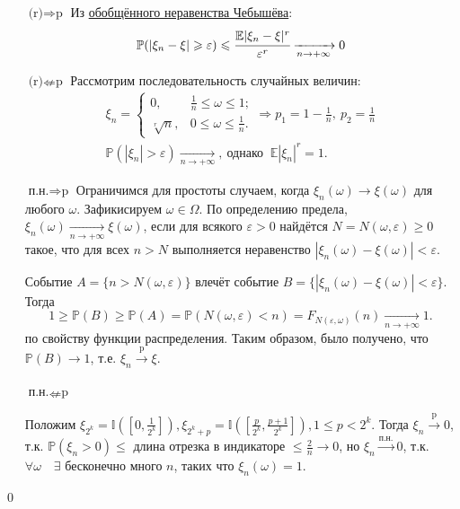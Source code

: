 \documentclass[oneside,final,14pt]{extreport}
\renewenvironment{proof}{{\bfseries Доказательство.}}{\qed}
\theoremstyle{plain}
\theoremstyle{definition}
\theoremstyle{named}
\begin{document}
\begin{proof}
    \begin{itemize}
        \item[$\text{(r)} \Rightarrow \text{p}$] Из \hyperlink{cheb}{обобщённого неравенства Чебышёва}:
    \begin{equation*}
        \mathbb{P}(|\xi_n - \xi| \geqslant \varepsilon) \leqslant \cfrac{\mathbb{E}|\xi_n - \xi|^{r}}{\varepsilon^{r}} \xrightarrow[n \to +\infty]{} 0
    \end{equation*}
    
    \item[$\text{(r)} \nLeftarrow \text{p}$] Рассмотрим последовательность случайных величин:
    \begin{gather*}
        \xi_n = 
        \begin{cases}
            0, & \frac{1}{n} \leqslant \omega \leqslant 1; \\
            \sqrt[r]{n}, & 0 \leqslant \omega \leqslant \frac{1}{n}.
        \end{cases}
        \Rightarrow p_1 = 1 - \frac{1}{n},~ p_2 = \frac{1}{n} \\
        \mathbb{P}(|\xi_n| > \varepsilon) \xrightarrow[n \to +\infty]{},~ \text{однако $~\mathbb{E}|\xi_n|^{r} = 1$}.
    \end{gather*}
    
    \item[$\text{п.н.} \Rightarrow \text{p}$]
    Ограничимся для простоты случаем, когда $\xi_n(\omega) \rightarrow \xi(\omega)$ для любого $\omega$. Зафикисируем $\omega \in \Omega.$ По определению предела, $\xi_n(\omega) \xrightarrow[n \to +\infty]{} \xi(\omega)$, если для всякого $\varepsilon > 0$ найдётся $N = N(\omega, \varepsilon) \geqslant 0$ такое, что для всех $n > N$ выполняется неравенство $|\xi_n(\omega) - \xi(\omega)| < \varepsilon$.
    
    Событие $A = \{n > N(\omega,\varepsilon) \}$ влечёт событие $B = \{|\xi_n(\omega) - \xi(\omega)| < \varepsilon \}$. Тогда 
    $$1 \geqslant \mathbb{P}(B) \geqslant \mathbb{P}(A)=\mathbb{P}(N(\omega, \varepsilon)<n)=F_{N(\varepsilon, \omega)}(n) \xrightarrow[n \to +\infty]{} 1.$$ по свойству функции распределения. Таким образом, было получено, что $\mathbb{P}(B) \rightarrow 1$, т.е. $\xi_n \xrightarrow[]{\text{p}} \xi.$
    
    \item[$\text{п.н.} \nLeftarrow \text{p}$]
    
    Положим $\xi_{2^{k}}=\mathbb{I}\left(\left[0, \frac{1}{2^{k}}\right]\right), \xi_{2^{k}+p}=\mathbb{I}\left(\left[\frac{p}{2^{k}}, \frac{p+1}{2^{k}}\right]\right), 1 \leqslant p<2^{k}.$ Тогда $\xi_n \xrightarrow[]{\text{p}} 0$, т.к. $\mathbb{P}(\xi_n > 0) \leqslant$ длина отрезка в индикаторе $\leqslant \frac{2}{n} \rightarrow 0$, но $\xi_n \overset{\text{п.н.}}{\rightarrow} 0$, т.к. $\forall \omega \quad \exists$ бесконечно много $n$, таких что $\xi_n(\omega) = 1.$
    

\end{itemize}
\end{proof}
\end{document}
